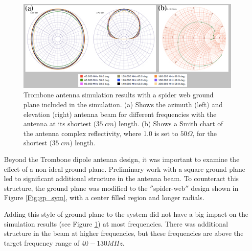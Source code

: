 \begin{figure}[htb]
\begin{center}
\includegraphics[width=0.95\linewidth]{SCIHI_system/figures/trombone_gp.jpg}
\caption{Trombone antenna simulation results with a spider web ground plane included in the simulation. (a) Shows the azimuth (left) and elevation (right) antenna beam for different frequencies with the antenna at its shortest ($35 \; cm$) length. (b) Shows a Smith chart of the antenna complex reflectivity, where 1.0 is set to $50 \Omega$, for the shortest ($35 \; cm$) length.}
\label{Fig:trsym_gp}
\end{center}
\end{figure}

Beyond the Trombone dipole antenna design, it was important to examine the effect of a non-ideal ground plane. Preliminary work with a square ground plane led to significant additional structure in the antenna beam. To counteract this structure, the ground plane was modified to the $''$spider-web$''$ design shown in Figure \ref{Fig:gp_sym}, with a center filled region and longer radials. 

Adding this style of ground plane to the system did not have a big impact on the simulation results (see Figure \ref{Fig:trsym_gp}) at most frequencies. There was additional structure in the beam at higher frequencies, but these frequencies are above the target frequency range of $40-130 MHz$.  

